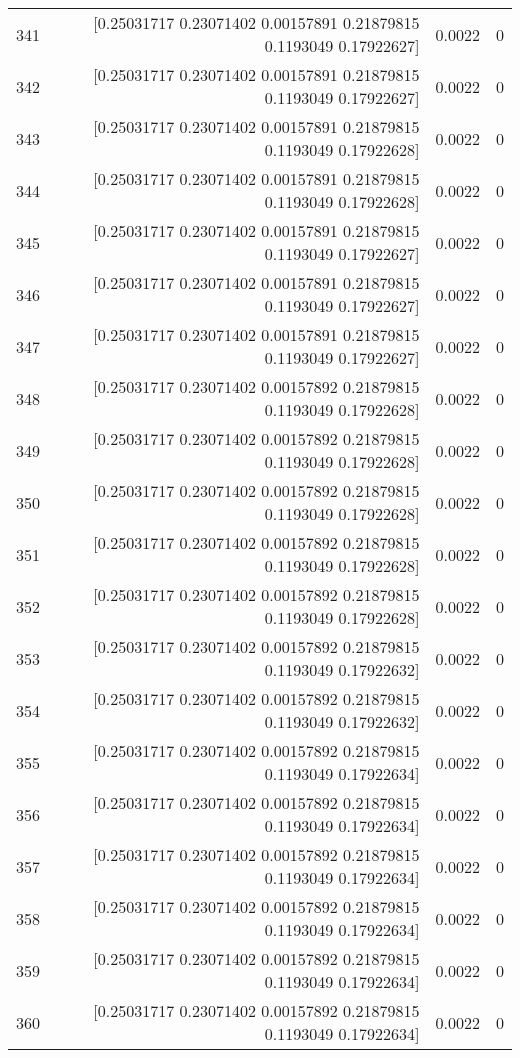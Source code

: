 \begin{longtable}{lrrr}
341 & [0.25031717 0.23071402 0.00157891 0.21879815 0.1193049  0.17922627] & 0.0022 & 0 \\
342 & [0.25031717 0.23071402 0.00157891 0.21879815 0.1193049  0.17922627] & 0.0022 & 0 \\
343 & [0.25031717 0.23071402 0.00157891 0.21879815 0.1193049  0.17922628] & 0.0022 & 0 \\
344 & [0.25031717 0.23071402 0.00157891 0.21879815 0.1193049  0.17922628] & 0.0022 & 0 \\
345 & [0.25031717 0.23071402 0.00157891 0.21879815 0.1193049  0.17922627] & 0.0022 & 0 \\
346 & [0.25031717 0.23071402 0.00157891 0.21879815 0.1193049  0.17922627] & 0.0022 & 0 \\
347 & [0.25031717 0.23071402 0.00157891 0.21879815 0.1193049  0.17922627] & 0.0022 & 0 \\
348 & [0.25031717 0.23071402 0.00157892 0.21879815 0.1193049  0.17922628] & 0.0022 & 0 \\
349 & [0.25031717 0.23071402 0.00157892 0.21879815 0.1193049  0.17922628] & 0.0022 & 0 \\
350 & [0.25031717 0.23071402 0.00157892 0.21879815 0.1193049  0.17922628] & 0.0022 & 0 \\
351 & [0.25031717 0.23071402 0.00157892 0.21879815 0.1193049  0.17922628] & 0.0022 & 0 \\
352 & [0.25031717 0.23071402 0.00157892 0.21879815 0.1193049  0.17922628] & 0.0022 & 0 \\
353 & [0.25031717 0.23071402 0.00157892 0.21879815 0.1193049  0.17922632] & 0.0022 & 0 \\
354 & [0.25031717 0.23071402 0.00157892 0.21879815 0.1193049  0.17922632] & 0.0022 & 0 \\
355 & [0.25031717 0.23071402 0.00157892 0.21879815 0.1193049  0.17922634] & 0.0022 & 0 \\
356 & [0.25031717 0.23071402 0.00157892 0.21879815 0.1193049  0.17922634] & 0.0022 & 0 \\
357 & [0.25031717 0.23071402 0.00157892 0.21879815 0.1193049  0.17922634] & 0.0022 & 0 \\
358 & [0.25031717 0.23071402 0.00157892 0.21879815 0.1193049  0.17922634] & 0.0022 & 0 \\
359 & [0.25031717 0.23071402 0.00157892 0.21879815 0.1193049  0.17922634] & 0.0022 & 0 \\
360 & [0.25031717 0.23071402 0.00157892 0.21879815 0.1193049  0.17922634] & 0.0022 & 0 \\

\end{longtable}
